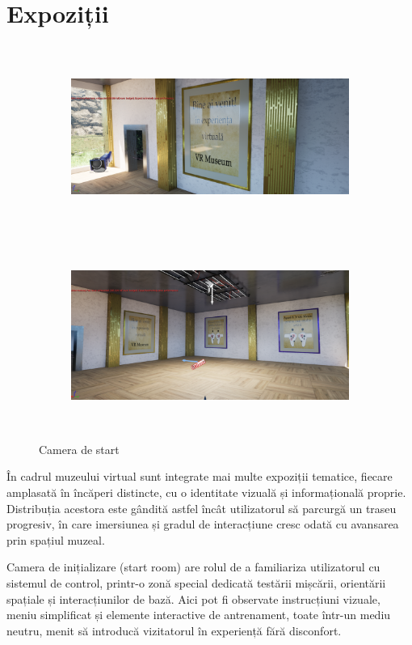 \section{Expoziții}

\begin{figure}[h!]
    \centering
    \begin{subfigure}{0.49\textwidth}
        \includegraphics[width=\linewidth, height=6cm]{continut/capitol3/figuri/panel.png}
        \label{fig:Terrain mapping}
    \end{subfigure}
    \hfill
    \begin{subfigure}{0.49\textwidth}
        \includegraphics[width=\linewidth, height=6cm]{continut/capitol3/figuri/panel2.png}
        \label{fig:Terrain mapping}
    \end{subfigure}
    \caption{Camera de start}
\end{figure}

În cadrul muzeului virtual sunt integrate mai multe expoziții tematice, fiecare amplasată în încăperi distincte, cu o identitate vizuală și informațională proprie. Distribuția acestora este gândită astfel încât utilizatorul să parcurgă un traseu progresiv, în care imersiunea și gradul de interacțiune cresc odată cu avansarea prin spațiul muzeal.

Camera de inițializare (start room) are rolul de a familiariza utilizatorul cu sistemul de control, printr-o zonă special dedicată testării mișcării, orientării spațiale și interacțiunilor de bază. Aici pot fi observate instrucțiuni vizuale, meniu simplificat și elemente interactive de antrenament, toate într-un mediu neutru, menit să introducă vizitatorul în experiență fără disconfort.

